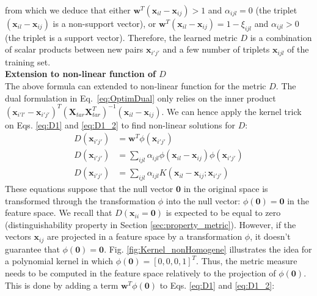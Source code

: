 \noindent from which we deduce that either $\textbf{w}^T(\textbf{x}_{il}-\textbf{x}_{ij}) > 1 $ and $\alpha_{ijl} = 0$ (the triplet $(\textbf{x}_{il}-\textbf{x}_{ij})$ is a non-support vector), or $\textbf{w}^T(\textbf{x}_{il}-\textbf{x}_{ij}) = 1- \xi_{ijl}$ and $\alpha_{ijl} > 0$ (the triplet is a support vector). Therefore, the learned metric $D$ is a combination of scalar products between new pairs $\textbf{x}_{i'j'}$ and a few number of triplets $\textbf{x}_{ijl}$ of the training set. \\


\noindent \textbf{Extension to non-linear function of $D$} \\
\noindent The above formula can extended to non-linear function for the metric $D$. The dual formulation in Eq.~\ref{eq:OptimDual} only relies on the inner product $(\textbf{x}_{i'l'}-\textbf{x}_{i'j'})^T (\textbf{X}_{tar} \textbf{X}_{tar}^T)^{-1} (\textbf{x}_{il}-\textbf{x}_{ij})$. We can hence apply the kernel trick on Eqs. \ref{eq:D1} and \ref{eq:D1_2} to find non-linear solutions for $D$:
\begin{align}
D(\textbf{x}_{i'j'}) & = \textbf{w}^T \phi(\textbf{x}_{i'j'}) \nonumber\\
D(\textbf{x}_{i'j'}) &= \sum\limits_{ijl} \alpha_{ijl} 
\phi(
\textbf{x}_{il}-\textbf{x}_{ij}
)
\phi(	
\textbf{x}_{i'j'}
) \nonumber \\
D(\textbf{x}_{i'j'}) &= \sum\limits_{ijl} \alpha_{ijl} 
K(\textbf{x}_{il}-\textbf{x}_{ij} ; \textbf{x}_{i'j'}) \nonumber				
\end{align}
These equations suppose that the null vector $\textbf{0}$ in the original space is transformed through the transformation $\phi$ into the null vector: $\phi(\textbf{0})=\textbf{0}$ in the feature space. We recall that $D(\textbf{x}_{ii} = \textbf{0})$ is expected to be equal to zero (distinguishability property in Section \ref{sec:property_metric}). However, if the vectors $\textbf{x}_{ij}$ are projected in a feature space by a transformation $\phi$, it doesn't guarantee that $\phi(\textbf{0})=\textbf{0}$. Fig. \ref{fig:Kernel_nonHomogene} illustrates the idea for a polynomial kernel in which $\phi(\textbf{0}) = [0, 0, 0, 1]^T$. Thus, the metric measure needs to be computed in the feature space relatively to the projection of $\phi(\textbf{0})$. This is done by adding a term $\textbf{w}^T \phi(\textbf{0})$ to Eqs. \ref{eq:D1} and \ref{eq:D1_2}:

